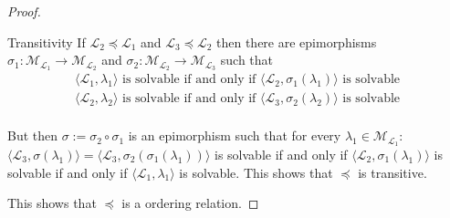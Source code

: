\begin{proof}
\begin{namedlist}[Transitivity]
		\item[Transitivity] If $\mathcal{L}_{2} \preceq \mathcal{L}_{1}$
		and $\mathcal{L}_{3} \preceq \mathcal{L}_{2}$ then there are
		epimorphisms $\sigma_{1} : \mathcal{M}_{\mathcal{L}_{1}}
		\rightarrow \mathcal{M}_{\mathcal{L}_{2}}$ and $\sigma_{2} :
		\mathcal{M}_{\mathcal{L}_{2}} \rightarrow
		\mathcal{M}_{\mathcal{L}_{3}}$ such that 
		\[
			\begin{array}{c}
				\langle\mathcal{L}_{1},\lambda_{1}\rangle \text{ is solvable if and only if } \langle\mathcal{L}_{2},\sigma_{1}(\lambda_{1})\rangle \text{ is solvable} \\
				\langle\mathcal{L}_{2},\lambda_{2}\rangle \text{ is solvable if and only if } \langle\mathcal{L}_{3},\sigma_{2}(\lambda_{2})\rangle \text{ is solvable} \\
			\end{array}
		\]
		
		But then $\sigma := \sigma_{2}\circ\sigma_{1}$ is an
		epimorphism such that for every $\lambda_{1} \in
		\mathcal{M}_{\mathcal{L}_{1}}$: $\langle \mathcal{L}_{3},
		\sigma(\lambda_{1}) \rangle = \langle \mathcal{L}_{3},
		\sigma_{2}(\sigma_{1}(\lambda_{1})) \rangle$ is solvable if and
		only if $\langle \mathcal{L}_{2}, \sigma_{1}(\lambda_{1})
		\rangle$ is solvable if and only if $\langle \mathcal{L}_{1},
		\lambda_{1} \rangle$ is solvable. This shows that $\preceq$ is
		transitive. 
	\end{namedlist}
	
	This shows that $\preceq$ is a ordering relation.
\end{proof}

